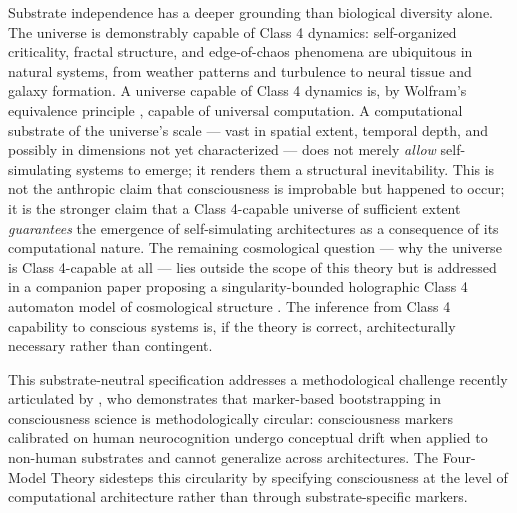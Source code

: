 \documentclass[12pt]{article}
\begin{document}
Substrate independence has a deeper grounding than biological diversity alone. The universe is demonstrably capable of Class 4 dynamics: self-organized criticality, fractal structure, and edge-of-chaos phenomena are ubiquitous in natural systems, from weather patterns and turbulence to neural tissue and galaxy formation. A universe capable of Class 4 dynamics is, by Wolfram's equivalence principle \citep{Wolfram2002}, capable of universal computation. A computational substrate of the universe's scale --- vast in spatial extent, temporal depth, and possibly in dimensions not yet characterized --- does not merely \emph{allow} self-simulating systems to emerge; it renders them a structural inevitability. This is not the anthropic claim that consciousness is improbable but happened to occur; it is the stronger claim that a Class 4-capable universe of sufficient extent \emph{guarantees} the emergence of self-simulating architectures as a consequence of its computational nature. The remaining cosmological question --- why the universe is Class 4-capable at all --- lies outside the scope of this theory but is addressed in a companion paper proposing a singularity-bounded holographic Class 4 automaton model of cosmological structure \citep{Gruber2026c}. The inference from Class 4 capability to conscious systems is, if the theory is correct, architecturally necessary rather than contingent.

This substrate-neutral specification addresses a methodological challenge recently articulated by \citet{Beni2026}, who demonstrates that marker-based bootstrapping in consciousness science is methodologically circular: consciousness markers calibrated on human neurocognition undergo conceptual drift when applied to non-human substrates and cannot generalize across architectures. The Four-Model Theory sidesteps this circularity by specifying consciousness at the level of computational architecture rather than through substrate-specific markers.
\end{document}
